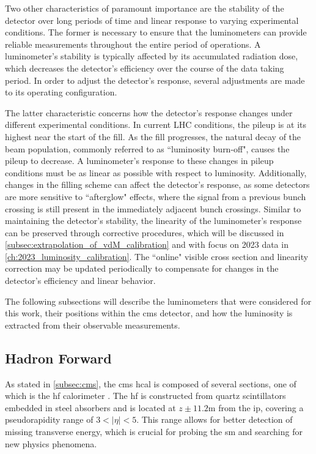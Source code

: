 Two other characteristics of paramount importance are the stability of the detector over long periods of time and linear response to varying experimental conditions. The former is necessary to ensure that the luminometers can provide reliable measurements throughout the entire period of operations. A luminometer’s stability is typically affected by its accumulated radiation dose, which decreases the detector’s efficiency over the course of the data taking period. In order to adjust the detector’s response, several adjustments are made to its operating configuration.

The latter characteristic concerns how the detector’s response changes under different experimental conditions. In current LHC conditions, the pileup is at its highest near the start of the fill. As the fill progresses, the natural decay of the beam population, commonly referred to as ``luminosity burn-off", causes the pileup to decrease. A luminometer’s response to these changes in pileup conditions must be as linear as possible with respect to luminosity. Additionally, changes in the filling scheme can affect the detector’s response, as some detectors are more sensitive to ``afterglow" effects, where the signal from a previous bunch crossing is still present in the immediately adjacent bunch crossings. Similar to maintaining the detector's stability, the linearity of the luminometer’s response can be preserved through corrective procedures, which will be discussed in \autoref{subsec:extrapolation_of_vdM_calibration} and with focus on 2023 data in \autoref{ch:2023_luminosity_calibration}. The ``online" visible cross section and linearity correction may be updated periodically to compensate for changes in the detector's efficiency and linear behavior.

The following subsections will describe the luminometers that were considered for this work, their positions within the \acrshort{cms} detector, and how the luminosity is extracted from their observable measurements.

\subsection{Hadron Forward}

As stated in \autoref{subsec:cms}, the \acrshort{cms} \acrshort{hcal} is composed of several sections, one of which is the \acrfull{hf} calorimeter \cite{CMS:2012tda}. The \acrshort{hf} is constructed from quartz scintillators embedded in steel absorbers and is located at $z \pm 11.2$m from the \acrshort{ip}, covering a pseudorapidity range of $3 < |\eta| < 5$. This range allows for better detection of missing transverse energy, which is crucial for probing the \acrshort{sm} and searching for new physics phenomena.

